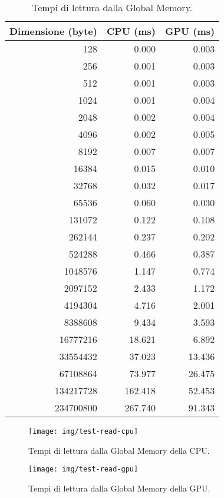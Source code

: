 \documentclass[12pt,a4paper,oneside]{book}
\begin{document}
\begin{table}[p]
\begin{center}
\begin{tabular}{|r|r|r|}
\hline
\textbf{Dimensione (byte)} & \textbf{CPU (ms)} & \textbf{GPU (ms)} \\
\hline
128 & 0.000 & 0.003 \\
\hline
256 & 0.001 & 0.003 \\
\hline
512 & 0.001 & 0.003 \\
\hline
1024 & 0.001 & 0.004 \\
\hline
2048 & 0.002 & 0.004 \\
\hline
4096 & 0.002 & 0.005 \\
\hline
8192 & 0.007 & 0.007 \\
\hline
16384 & 0.015 & 0.010 \\
\hline
32768 & 0.032 & 0.017 \\
\hline
65536 & 0.060 & 0.030 \\
\hline
131072 & 0.122 & 0.108 \\
\hline
262144 & 0.237 & 0.202 \\
\hline
524288 & 0.466 & 0.387 \\
\hline
1048576 & 1.147 & 0.774 \\
\hline
2097152 & 2.433 & 1.172 \\
\hline
4194304 & 4.716 & 2.001 \\
\hline
8388608 & 9.434 & 3.593 \\
\hline
16777216 & 18.621 & 6.892 \\
\hline
33554432 & 37.023 & 13.436 \\
\hline
67108864 & 73.977 & 26.475 \\
\hline
134217728 & 162.418 & 52.453 \\
\hline
234700800 & 267.740 & 91.343 \\
\hline
\end{tabular}
\caption{Tempi di lettura dalla Global Memory.\label{tab:test-read}}
\end{center}
\end{table}

\begin{figure}[p]
\begin{center}
\texttt{[image: img/test-read-cpu]}
\caption{Tempi di lettura dalla Global Memory della CPU.\label{fig:test-read-cpu}}
\end{center}
\end{figure}

\begin{figure}[p]
\begin{center}
\texttt{[image: img/test-read-gpu]}
\caption{Tempi di lettura dalla Global Memory della GPU.\label{fig:test-read-gpu}}
\end{center}
\end{figure}
\end{document}
